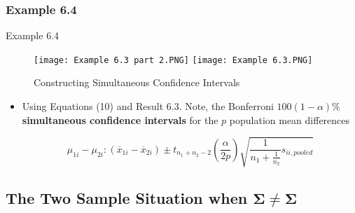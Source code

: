\documentclass[8pt]{beamer}
\begin{document}
\subsubsection{Example 6.4}
    \begin{frame}{Example 6.4}
        \begin{figure}
            \texttt{[image: Example 6.3 part 2.PNG]}
            \texttt{[image: Example 6.3.PNG]}
            \caption{Constructing Simultaneous Confidence Intervals}
        \end{figure}
        
        \begin{itemize}
            \item Using Equations (10) and Result 6.3. Note, the Bonferroni $100(1 - \alpha)\%$ \textbf{simultaneous confidence intervals} for the $p$ population mean differences
            
            \begin{equation}
                \mu_{1i} - \mu_{2i}: (\overline{x}_{1i} - \overline{x}_{2i}) \pm t_{n_{1} + n_{2}-2}\left(\frac{\alpha}{2p} \right)\sqrt{\frac{1}{n_{1} + \frac{1}{n_{2}}}s_{ii,pooled}}
            \end{equation}
            
        \end{itemize}
        
    \end{frame}

    
    \subsection{The Two Sample Situation when $\mathbf{\Sigma \neq \Sigma}$}
    
\end{document}
